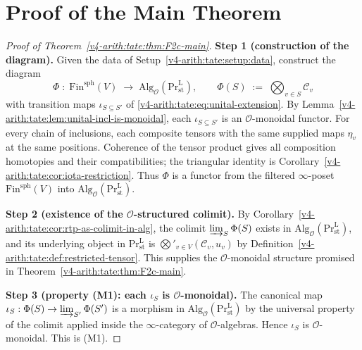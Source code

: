 \section{Proof of the Main Theorem}
\label{v4-arith:tate:main-proof}

\begin{proof}[Proof of Theorem~\ref{v4-arith:tate:thm:F2c-main}]

\medskip\noindent\textbf{Step 1 (construction of the diagram).}
Given the data of Setup~\ref{v4-arith:tate:setup:data}, construct
the diagram
\[
\Phi\;:\;\mathrm{Fin}^{\mathrm{sph}}(V)\;\longrightarrow\;\mathrm{Alg}_{\mathcal{O}}(\mathrm{Pr}^{\mathrm{L}}_{\mathrm{st}}),
\qquad\Phi(S)\;:=\;\bigotimes_{v\in S}\mathcal{C}_{v}
\]
with transition maps \(\iota_{S\subseteq S'}\) of
\eqref{v4-arith:tate:eq:unital-extension}. By
Lemma~\ref{v4-arith:tate:lem:unital-incl-is-monoidal}, each
\(\iota_{S\subseteq S'}\) is an \(\mathcal{O}\)-monoidal functor.
For every chain of inclusions, each composite tensors with the
same supplied maps \(\eta_v\) at the same positions. Coherence of
the tensor product gives all composition homotopies and their
compatibilities; the triangular identity is
Corollary~\ref{v4-arith:tate:cor:iota-restriction}. Thus \(\Phi\) is a functor
from the filtered \(\infty\)-poset
\(\mathrm{Fin}^{\mathrm{sph}}(V)\) into
\(\mathrm{Alg}_{\mathcal{O}}(\mathrm{Pr}^{\mathrm{L}}_{\mathrm{st}})\).

\medskip\noindent\textbf{Step 2 (existence of the \(\mathcal{O}\)-structured colimit).}
By
Corollary~\ref{v4-arith:tate:cor:rtp-as-colimit-in-alg}, the colimit
\(\varinjlim_{S}\Phi(S)\) exists in
\(\mathrm{Alg}_{\mathcal{O}}(\mathrm{Pr}^{\mathrm{L}}_{\mathrm{st}})\),
and its underlying object in
\(\mathrm{Pr}^{\mathrm{L}}_{\mathrm{st}}\) is
\(\bigotimes'_{v\in V}(\mathcal{C}_{v},u_{v})\) by
Definition~\ref{v4-arith:tate:def:restricted-tensor}. This supplies the
\(\mathcal{O}\)-monoidal structure promised in
Theorem~\ref{v4-arith:tate:thm:F2c-main}.

\medskip\noindent\textbf{Step 3 (property (M1): each \(\iota_{S}\) is \(\mathcal{O}\)-monoidal).}
The canonical map
\(\iota_{S}:\Phi(S)\to\varinjlim_{S'}\Phi(S')\) is a morphism in
\(\mathrm{Alg}_{\mathcal{O}}(\mathrm{Pr}^{\mathrm{L}}_{\mathrm{st}})\)
by the universal property of the colimit applied inside the
\(\infty\)-category of \(\mathcal{O}\)-algebras. Hence \(\iota_{S}\) is
\(\mathcal{O}\)-monoidal. This is (M1).


\end{proof}
